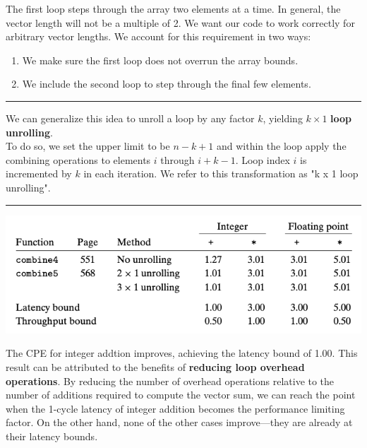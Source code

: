 \documentclass[11pt]{article}
\begin{document}
The first loop steps through the array two elements at a time. In general, the vector length will not be a multiple of 2. We want our code to work correctly for arbitrary vector lengths. We account for this requirement in two ways:\\
\begin{enumerate}
\item We make sure the first loop does not overrun the array bounds.\\
\item We include the second loop to step through the final few elements.\\
\end{enumerate}

\noindent\rule{\textwidth}{0.5pt}
We can generalize this idea to unroll a loop by any factor \(k\), yielding \(k \times 1\) \textbf{loop unrolling}.\\
To do so, we set the upper limit to be \(n-k+1\) and within the loop apply the combining operations to elements \(i\) through \(i+k-1\). Loop index \(i\) is incremented by \(k\) in each iteration. We refer to this transformation as "k x 1 loop unrolling".\\

\noindent\rule{\textwidth}{0.5pt}

\begin{center}
\includegraphics[width=.9\linewidth]{pics/loop-unrolling-combine5.png}
\end{center}

The CPE for integer addtion improves, achieving the latency bound of 1.00. This result can be attributed to the benefits of \textbf{reducing loop overhead operations}. By reducing the number of overhead operations relative to the number of additions required to compute the vector sum, we can reach the point when the 1-cycle latency of integer addition becomes the performance limiting factor. On the other hand, none of the other cases improve—they are already at their latency bounds.\\
\end{document}

